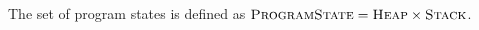 The set of program states is defined as $\textup{\textsc{ProgramState}} = \textup{\textsc{Heap}} \times \textup{\textsc{Stack}}$.


\begin{comment}
REQUIRED?
\begin{definition}[Topmost Stack Entry]
    Let $\topmost : \setStack \rightharpoonup \setStackEntry$ be defined as
    \begin{align*}
    &\topmost(E \cdot S) = E\\
    &\topmost(\nil) \quad\textit{ undefined}
    \end{align*}
\end{definition}
\end{comment}


\begin{comment}
Program states with scheduled statement $s$ are defined as
\begin{displaymath}
\setProgramState_s ~\defeq~ \setHeap ~\times~ \{~~ (\rho, A_d, s) \cdot S ~~|~~ \rho \in \setVarEnv,~ A_d \in \setDFootprint,~ S \in \setStack ~~\}
\end{displaymath}
\end{comment}